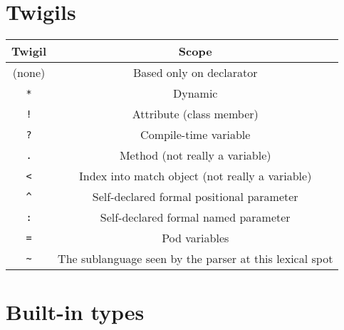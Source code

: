 \documentclass[17pt,english]{extarticle}
\providecommand{\tabularnewline}{\\}
\begin{document}
\section*{Twigils}

{\scriptsize{}}%
\begin{tabular}{|c|c|}
\hline 
\textbf{\small{}Twigil} &
\textbf{\small{}Scope}\tabularnewline
\hline 
\hline 
{\small{}(none)} &
{\small{}Based only on declarator}\tabularnewline
\hline 
\texttt{\small{}{*}} &
{\small{}Dynamic}\tabularnewline
\hline 
\texttt{\small{}!} &
{\small{}Attribute (class member)}\tabularnewline
\hline 
\texttt{\small{}?} &
{\small{}Compile-time variable}\tabularnewline
\hline 
\texttt{\small{}.} &
{\small{}Method (not really a variable)}\tabularnewline
\hline 
\texttt{\small{}<} &
{\small{}Index into match object (not really a variable)}\tabularnewline
\hline 
\texttt{\small{}\textasciicircum{}} &
{\small{}Self-declared formal positional parameter}\tabularnewline
\hline 
\texttt{\small{}:} &
{\small{}Self-declared formal named parameter}\tabularnewline
\hline 
\texttt{\small{}=} &
{\small{}Pod variables}\tabularnewline
\hline 
\texttt{\small{}\textasciitilde{}} &
{\small{}The sublanguage seen by the parser at this lexical spot}\tabularnewline
\hline 
\end{tabular}{\scriptsize \par}


\section*{Built-in types}
\end{document}
